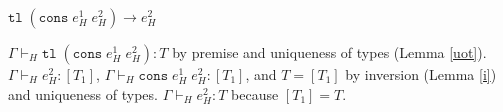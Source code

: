 \begin{case}
$\mathtt{tl}\;(\mathtt{cons}\;e_{H}^{1}\;e_{H}^{2})\rightarrow e_{H}^{2}$

$\Gamma\vdash_{H}\mathtt{tl}\;(\mathtt{cons}\;e_{H}^{1}\;e_{H}^{2}):T$ by premise and uniqueness of types (Lemma \ref{uot}).  $\Gamma\vdash_{H}e_{H}^{2}:[T_{1}]$, $\Gamma\vdash_{H}\mathtt{cons}\;e_{H}^{1}\;e_{H}^{2}:[T_{1}]$, and $T=[T_{1}]$ by inversion (Lemma \ref{i}) and uniqueness of types.  $\Gamma\vdash_{H}e_{H}^{2}:T$ because $[T_{1}]=T$.
\end{case}